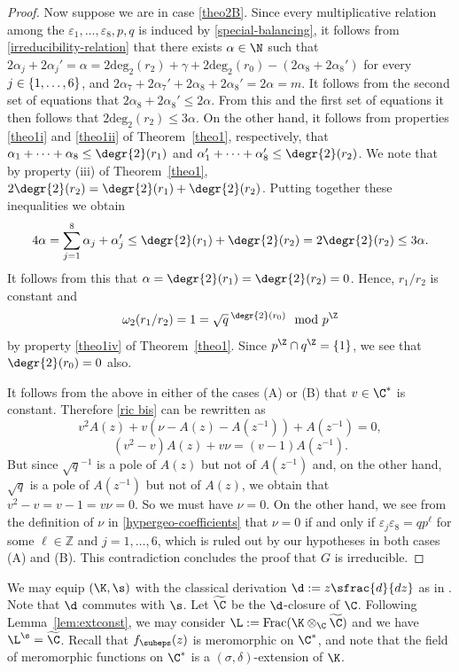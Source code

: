 \begin{proof}
Now suppose we are in case \eqref{theo2B}. Since every multiplicative relation among the $\varepsilon_{1},\dots,\varepsilon_{8},p,q$ is induced by \eqref{special-balancing}, it follows from \eqref{irreducibility-relation} that there exists $\alpha\in\N$ such that $2\alpha_j+2\alpha_j'=\alpha=2\mathrm{deg}_2(r_2)+\gamma+2\mathrm{deg}_2(r_0)-(2\alpha_8+2\alpha_8')$ for every $j\in\nobreak\{1,\dots,6\}$, and $2\alpha_7+2\alpha_7'+2\alpha_8+2\alpha_8'=2\alpha=m$. It follows from the second set of equations that $2\alpha_8+2\alpha_8'\leq 2\alpha$. From this and the first set of equations it then follows that $2\mathrm{deg}_2(r_2)\leq 3\alpha$. On the other hand, it follows from properties \eqref{theo1i} and \eqref{theo1ii} of Theorem~\ref{theo1}, respectively, that $\alpha_1+\dots+\alpha_8\leq\degr{2}(r_1)$ and $\alpha_1'+\dots+\alpha_8'\leq\degr{2}(r_2)$. We note that by property (iii) of Theorem~\ref{theo1}, $2\degr{2}(r_2)=\degr{2}(r_1)+\degr{2}(r_2)$. Putting together these inequalities we obtain
\[
4\alpha=\sum_{j=1}^8\alpha_j+\alpha_j'\leq\degr{2}(r_1)+\degr{2}(r_2)=2\degr{2}(r_2)\leq 3\alpha.
\]
It follows from this that $\alpha=\degr{2}(r_1)=\degr{2}(r_2)=0$. Hence, $r_1/r_2$ is constant and
\[
\omega_2(r_1/r_2)=1=\sqrt{q}\,^{\degr{2}(r_0)} \mod p^\Z
\]
by property \eqref{theo1iv} of Theorem~\ref{theo1}. Since $p^\Z\cap q^\Z=\{1\}$, we see that ${\degr{2}(r_0)=0}$ also.

It follows from the above in either of the cases (A) or (B) that $v\in \C^{*}$ is constant. Therefore \eqref{ric bis} can be rewritten as
\begin{equation}\label{eq1}
v^{2}A(z)+v(\nu-A(z)-A(z^{-1}))+A(z^{-1})=0,
\end{equation}
\ie
\begin{equation}\label{eq1bis}
(v^{2}-v)A(z)+v\nu=(v-1)A(z^{-1}).
\end{equation}
But since $\sqrt{q}^{-1}$ is a pole of $A(z)$ but not of $A(z^{-1})$ and, on the other hand, $\sqrt{q}$ is a pole of $A(z^{-1})$ but not of $A(z)$, we obtain that $v^{2}-v=v-1=v\nu=0$. So we must have $\nu=0$. On the other hand, we see from the definition of $\nu$ in \eqref{hypergeo-coefficients} that $\nu=0$ if and only if $\varepsilon_j\varepsilon_8=qp^\ell$ for some $\ell\in\mathbb{Z}$ and $j=1,\dots,6$, which is ruled out by our hypotheses in both cases (A) and (B).
This contradiction concludes the proof that $G$ is irreducible.
\end{proof}

We may equip $(\K,\s)$ with the classical derivation $\d:=z\sfrac{d}{dz}$ as in \cite[\S 3.1]{dreyfus2018nature}. Note that $\d$ commutes with $\s$. Let $\widetilde{\C}$ be the $\d$-closure of $\C$. Following Lemma~\ref{lem:extconst}, we may consider $\L:=\mathrm{Frac} (\K\otimes_{\C}\widetilde{\C})$ and we have $\L^{\s}= \widetilde{\C}$. Recall that $f_{\subeps}(z)$ is meromorphic on $\C^{*}$, and note that the field of meromorphic functions on $\C^*$ is a $(\sigma,\delta)$-extension of $\K$.

